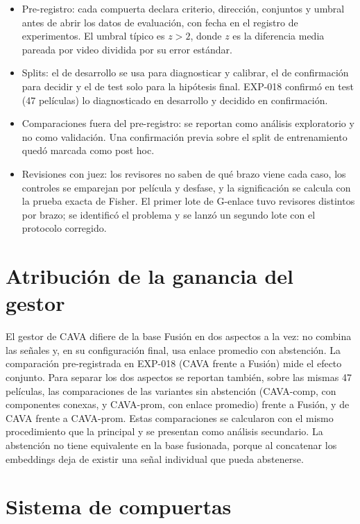 \begin{itemize}
  \item Pre-registro: cada compuerta declara criterio, dirección, conjuntos y umbral antes
        de abrir los datos de evaluación, con fecha en el registro de experimentos. El
        umbral típico es $z > 2$, donde $z$ es la diferencia media pareada por video
        dividida por su error estándar.
  \item Splits: el de desarrollo se usa para diagnosticar y calibrar, el de confirmación
        para decidir y el de test solo para la hipótesis final. EXP-018 confirmó en test (47
        películas) lo diagnosticado en desarrollo y decidido en confirmación.
  \item Comparaciones fuera del pre-registro: se reportan como análisis exploratorio y no
        como validación. Una confirmación previa sobre el split de entrenamiento quedó
        marcada como post hoc.
  \item Revisiones con juez: los revisores no saben de qué brazo viene cada caso, los
        controles se emparejan por película y desfase, y la significación se calcula con la
        prueba exacta de Fisher. El primer lote de G-enlace tuvo revisores distintos por
        brazo; se identificó el problema y se lanzó un segundo lote con el protocolo
        corregido.
\end{itemize}

\section{Atribución de la ganancia del gestor}

El gestor de CAVA difiere de la base Fusión en dos aspectos a la vez: no combina las
señales y, en su configuración final, usa enlace promedio con abstención. La comparación
pre-registrada en EXP-018 (CAVA frente a Fusión) mide el efecto conjunto. Para separar los
dos aspectos se reportan también, sobre las mismas 47 películas, las comparaciones de las
variantes sin abstención (CAVA-comp, con componentes conexas, y CAVA-prom, con enlace
promedio) frente a Fusión, y de CAVA frente a CAVA-prom. Estas comparaciones se calcularon
con el mismo procedimiento que la principal y se presentan como análisis secundario. La abstención no tiene equivalente en la
base fusionada, porque al concatenar los embeddings deja de existir una señal individual que
pueda abstenerse.

\section{Sistema de compuertas}

